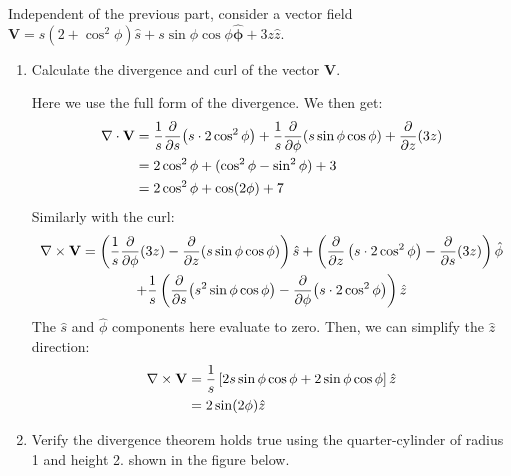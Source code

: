 \documentclass[10pt]{article}
\begin{document}
    Independent of the previous part, consider a vector field $\mathbf V = s(2 + \cos^2 \phi) \hat s + s \sin \phi \cos \phi \mathbf{ \hat \phi} + 3z \hat z$.

    \begin{enumerate}[label= (\alph*), resume]
        \item Calculate the divergence and curl of the vector $\mathbf V$. 

        \begin{solution}
            Here we use the full form of the divergence. We then get: 
            \begin{align*}
                \nabla \cdot \mathbf V &= \frac 1s \pdv{s} (s \cdot 2\cos^2 \phi) + \frac 1s \pdv{\phi}(s \sin \phi \cos \phi) + \pdv{z} (3z)\\
                &= 2\cos^2 \phi + (\cos^2 \phi - \sin^2 \phi) + 3 \\
                &= 2\cos^2 \phi + \cos(2\phi) + 7
            \end{align*}
            Similarly with the curl: 
            \begin{multline*}
                \nabla \times \mathbf V = \left( \frac1s \pdv{\phi}(3z) - \pdv{z} (s \sin \phi \cos \phi)\right)  \hat s + \left(\pdv{z} \left( s \cdot 2\cos^2 \phi\right) - \pdv{s}(3z)\right) \hat \phi \\ + \frac 1s \left( \pdv{s}(s^2 \sin \phi \cos \phi) - \pdv{\phi} (s \cdot 2 \cos^2 \phi)\right) \hat z
            \end{multline*}
            The $\hat s$ and $\hat \phi$ components here evaluate to zero. Then, we can simplify the $\hat z$ direction:
            \begin{align*}
                \nabla \times \mathbf V &= \frac 1s \left[2s \sin \phi \cos \phi + 2 \sin \phi \cos \phi\right]\hat z\\
                &= 2\sin(2\phi) \hat z
            \end{align*}
        \end{solution}
        \item Verify the divergence theorem holds true using the quarter-cylinder of radius 1 and height 2. shown in the figure below.
        \begin{center}
\end{center}
\end{enumerate}
\end{document}
